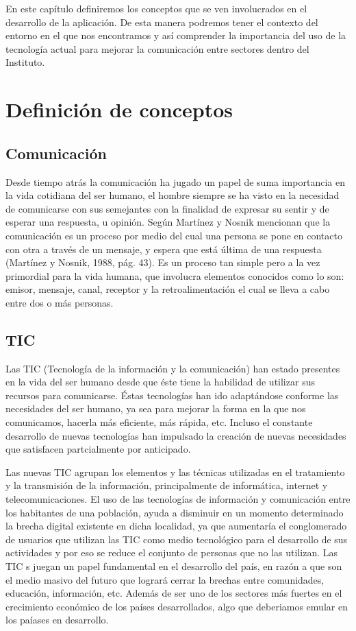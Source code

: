 
En este capítulo definiremos los conceptos que se ven involucrados en el desarrollo de la aplicación. De esta manera podremos tener el contexto del entorno en el que nos encontramos y así comprender la importancia del uso de la tecnología actual para mejorar la comunicación entre sectores dentro del Instituto.


\section{Definición de conceptos}
	\subsection{Comunicación}
	Desde tiempo atrás la comunicación ha jugado un papel de suma importancia en la vida cotidiana del ser humano, el hombre siempre se ha visto en la necesidad de comunicarse con sus semejantes con la finalidad de expresar su sentir y de esperar una respuesta, u opinión. Según Martínez y Nosnik mencionan que la comunicación es un proceso por medio del cual una persona se pone en contacto con otra a través de un mensaje, y espera que está última de una respuesta (Martínez y Nosnik, 1988, pág. 43). Es un proceso tan simple pero a la vez primordial para la vida humana, que involucra elementos conocidos como lo son: emisor, mensaje, canal, receptor y la retroalimentación el cual se lleva a cabo entre dos o más personas.\\

	\subsection{TIC}
	Las TIC (Tecnología de la información y la comunicación) han estado presentes en la vida del ser humano desde que éste tiene la habilidad de utilizar sus recursos para comunicarse. Éstas tecnologías han ido adaptándose conforme las necesidades del ser humano, ya sea para mejorar la forma en la que nos comunicamos, hacerla más eficiente, más rápida, etc. Incluso el constante desarrollo de nuevas tecnologías han impulsado la creación de nuevas necesidades que satisfacen partcialmente por anticipado.
	 
	Las nuevas TIC agrupan los elementos y las técnicas utilizadas en el tratamiento y la transmisión de la información, principalmente de informática, internet y telecomunicaciones. El uso de las tecnologías de información y comunicación entre los habitantes de una población, ayuda a disminuir en un momento determinado la brecha digital existente en dicha localidad, ya que aumentaría el conglomerado de usuarios que utilizan las TIC como medio tecnológico para el desarrollo de sus actividades y por eso se reduce el conjunto de personas que no las utilizan. Las TIC s juegan un papel fundamental en el desarrollo del país, en razón a que son el medio masivo del futuro que logrará cerrar la brechas entre comunidades, educación, información, etc. Además de ser uno de los sectores más fuertes en el crecimiento económico de los países desarrollados, algo que deberiamos emular en los paíases en desarrollo.
	
